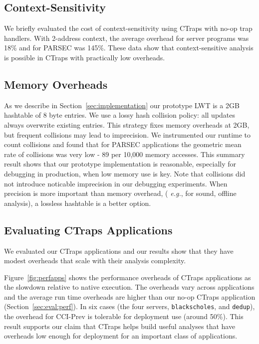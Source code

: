 \documentclass[10pt,nocopyrightspace]{sigplanconf}
\newcommand{\ctraps}{CTraps\xspace}
\newcommand{\lwt}{LWT\xspace}
\begin{document}
\subsection{Context-Sensitivity}
We briefly evaluated the cost of context-sensitivity using \ctraps with no-op
trap handlers.  With 2-address context, the average overhead for server
programs was 18\% and for PARSEC was 145\%.  These data show that
context-sensitive analysis is possible in \ctraps with practically low overheads.

\subsection{Memory Overheads}
\label{sec:eval:performance:collisions}
As we describe in Section~\ref{sec:implementation} our prototype \lwt is a 2GB
hashtable of 8 byte entries.  We use a lossy hash collision policy: all updates
always overwrite existing entries.  This strategy fixes memory overheads at
2GB, but frequent collisions may lead to imprecision.   We instrumented our
runtime to count collisions and found that for PARSEC applications the
geometric mean rate of collisions was very low - 89 per 10,000 memory accesses.
This summary result shows that our prototype implementation is reasonable,
especially for debugging in production, when low memory use is key.  Note that
collisions did not introduce noticable imprecision in our debugging
experiments.  When precision is more important than memory overhead, ({\em
e.g.}, for sound, offline analysis), a lossless hashtable is a better option.  

\subsection{Evaluating CTraps Applications}
\label{sec:appperf}
We evaluated our CTraps applications and our results show that 
they have modest overheads that scale with their analysis complexity. 

Figure~\ref{fig:perfapps} shows the performance overheads of 
\ctraps applications as the slowdown relative to native execution.  The overheads
vary across applications and the average run time overheads are
higher than our no-op \ctraps application (Section~\ref{sec:eval:perf}).  In
six cases (the four servers, {\tt blackscholes}, and {\tt dedup}), the overhead
for CCI-Prev is tolerable for deployment use (around 50\%).  This result
supports our claim that \ctraps helps build useful analyses that have overheads
low enough for deployment for an important class of applications.  
\end{document}
